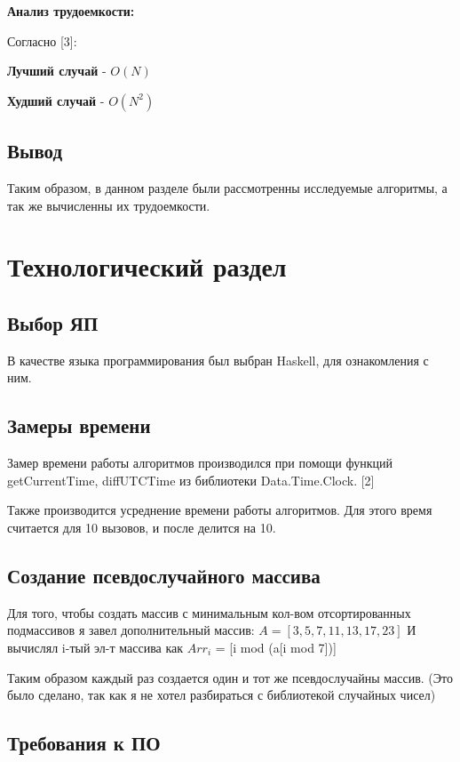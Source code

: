 \documentclass[12pt]{report}
\begin{document}
\begin{center}
	\textbf{Анализ трудоемкости:}
\end{center}
Согласно [3]:

\textbf{Лучший случай} - {$O(N)$}

\textbf{Худший случай} - {$O(N^2)$}

\section*{Вывод}
Таким образом, в данном разделе были рассмотренны исследуемые алгоритмы, а так же вычисленны их трудоемкости.

\chapter{Технологический раздел}
\section{Выбор ЯП}
В качестве языка программирования был выбран Haskell, для ознакомления с ним.

\section{Замеры времени}
Замер времени работы алгоритмов производился при помощи функций getCurrentTime, diffUTCTime из библиотеки Data.Time.Clock. [2]

Также производится усреднение времени работы алгоритмов. Для этого время считается для 10 вызовов, и после делится на 10.

\section{Создание псевдослучайного массива}
	Для того, чтобы создать массив с минимальным кол-вом отсортированных подмассивов я завел дополнительный массив: {$A = [3, 5, 7, 11, 13, 17, 23]$}
	И вычислял i-тый эл-т массива как {$Arr_{i}$} = [i mod (a[i mod 7])]
	
	Таким образом каждый раз создается один и тот же псевдослучайны массив.
	(Это было сделано, так как я не хотел разбираться с библиотекой случайных чисел)
	

\section{Требования к ПО}
\end{document}
